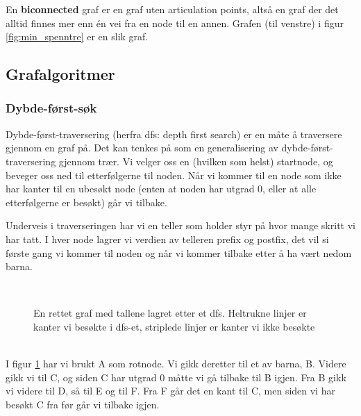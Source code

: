 En \textbf{biconnected} graf er en graf uten articulation points, altså en graf der det alltid finnes mer enn én vei fra en node til en annen. Grafen (til venstre) i figur \ref{fig:min_spenntre} er en slik graf. 

\subsection{Grafalgoritmer}
\vspace{-40pt}
\subsubsection{Dybde-først-søk}
\label{dfs}
Dybde-først-traversering (herfra dfs: depth first search) er en måte å traversere gjennom en graf på. Det kan tenkes på som en generalisering av dybde-først-traversering gjennom trær. Vi velger oss en (hvilken som helst) startnode, og beveger oss ned til etterfølgerne til noden. Når vi kommer til en node som ikke har kanter til en ubesøkt node (enten at noden har utgrad 0, eller at alle etterfølgerne er besøkt) går vi tilbake. 

Underveis i traverseringen har vi en teller som holder styr på hvor mange skritt vi har tatt. I hver node lagrer vi verdien av telleren prefix og postfix, det vil si første gang vi kommer til noden og når vi kommer tilbake etter å ha vært nedom barna. 
~\\
\begin{figure}[H]
\centering
\captionsetup{justification=centering,margin=1cm}
\caption{En rettet graf med tallene lagret etter et dfs. Heltrukne linjer er kanter vi besøkte i dfs-et, striplede linjer er kanter vi ikke besøkte}~\\
\label{fig:dfs}
\end{figure}
~\\
I figur \ref{fig:dfs} har vi brukt A som rotnode. Vi gikk deretter til et av barna, B. Videre gikk vi til C, og siden C har utgrad 0 måtte vi gå tilbake til B igjen. Fra B gikk vi videre til D, så til E og til F. Fra F går det en kant til C, men siden vi har besøkt C fra før går vi tilbake igjen. 

